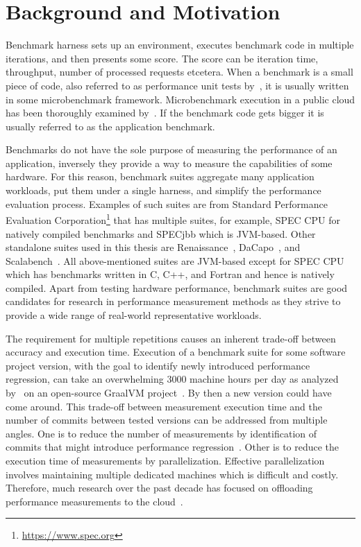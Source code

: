 \chapter{Background and Motivation}
\label{chap:background}

Benchmark harness sets up an environment, executes benchmark code in multiple iterations, and then presents some score.
The score can be iteration time, throughput, number of processed requests etcetera.
When a benchmark is a small piece of code, also referred to as performance unit tests by~\citet{horky2015unit}, it is usually written in some microbenchmark framework.
Microbenchmark execution in a public cloud has been thoroughly examined by~\citet{laaber2019software}.
If the benchmark code gets bigger it is usually referred to as the application benchmark.

Benchmarks do not have the sole purpose of measuring the performance of an application, inversely they provide a way to measure the capabilities of some hardware.
For this reason, benchmark suites aggregate many application workloads, put them under a single harness, and simplify the performance evaluation process.
Examples of such suites are from Standard Performance Evaluation Corporation\footnote{\url{https://www.spec.org}} that has multiple suites, for example, SPEC CPU for natively compiled benchmarks and SPECjbb which is \mbox{JVM-based}.
Other standalone suites used in this thesis are Renaissance~\cite{prokopec2019renaissance}, DaCapo~\cite{blackburn2006dacapo}, and Scalabench~\cite{sewe2011capo}.
All above-mentioned suites are \mbox{JVM-based} except for SPEC CPU which has benchmarks written in C, C++, and Fortran and hence is natively compiled.
Apart from testing hardware performance, benchmark suites are good candidates for research in performance measurement methods as they strive to provide a wide range of real-world representative workloads.

The requirement for multiple repetitions causes an inherent trade-off between accuracy and execution time.
Execution of a benchmark suite for some software project version, with the goal to identify newly introduced performance regression, can take an overwhelming 3000 machine hours per day as analyzed by~\citet{bulej2020duet} on an open-source GraalVM project~\cite{oracleGraal}.
By then a new version could have come around.
This trade-off between measurement execution time and the number of commits between tested versions can be addressed from multiple angles.
One is to reduce the number of measurements by identification of commits that might introduce performance regression~\citet{oliveira2017perphecy}.
Other is to reduce the execution time of measurements by parallelization.
Effective parallelization involves maintaining multiple dedicated machines which is difficult and costly.
Therefore, much research over the past decade has focused on offloading performance measurements to the cloud~\cite{leitner2016patterns, laaber2019software, abedi2017conducting}.

